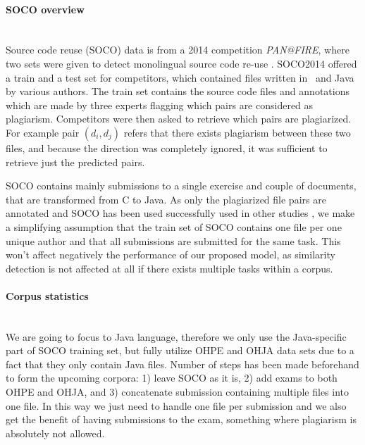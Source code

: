 \paragraph{SOCO overview}\mbox{}\\
Source code reuse (SOCO) data is from a 2014 competition \emph{PAN@FIRE}, where two sets were given to detect monolingual source code re-use \cite{saez2014pan}. SOCO2014 offered a train and a test set for competitors, which contained files written in \cpp\, and Java by various authors. The train set contains the source code files and annotations which are made by three experts flagging which pairs are considered as plagiarism. Competitors were then asked to retrieve which pairs are plagiarized. For example pair $(d_i, d_j)$ refers that there exists plagiarism between these two files, and because the direction was completely ignored, it was sufficient to retrieve just the predicted pairs.

SOCO contains mainly submissions to a single exercise and couple of documents, that are transformed from C to Java. As only the plagiarized file pairs are annotated and SOCO has been used successfully used in other studies \cite{AIR2015, RCISCP2017, OTIOLSS2015, USCR2014}, we make a simplifying assumption that the train set of SOCO contains one file per one unique author and that all submissions are submitted for the same task. This won't affect negatively the performance of our proposed model, as similarity detection is not affected at all if there exists multiple tasks within a corpus. 



\paragraph{Corpus statistics}\mbox{}\\
We are going to focus to Java language, therefore we only use the Java-specific part of SOCO training set, but fully utilize OHPE and OHJA data sets due to a fact that they only contain Java files. Number of steps has been made beforehand to form the upcoming corpora: 1) leave SOCO as it is, 2) add exams to both OHPE and OHJA, and 3) concatenate submission containing multiple files into one file. In this way we just need to handle one file per submission and we also get the benefit of having submissions to the exam, something where plagiarism is absolutely not allowed. 


